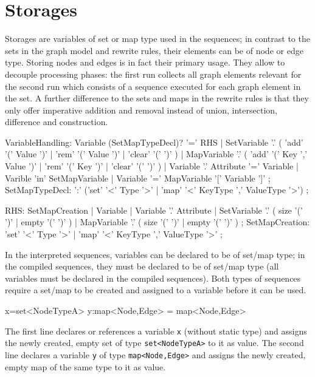 \section{Storages}

Storages are variables of set or map type used in the sequences;
in contrast to the sets in the graph model and rewrite rules, their elements can be of node or edge type. 
Storing nodes and edges is in fact their primary usage. 
They allow to decouple processing phases: the first run collects all graph elements relevant for the second run which consists of a sequence executed for each graph element in the set.
A further difference to the sets and maps in the rewrite rules is that they only offer imperative addition and removal instead of union, intersection, difference and construction.
 
\begin{rail}
  VariableHandling: 
    Variable (SetMapTypeDecl)? '=' RHS |
    SetVariable '.' ( 'add' '(' Value ')' | 'rem' '(' Value ')' | 'clear' '(' ')' ) |
    MapVariable '.' ( 'add' '(' Key ',' Value ')' | 'rem' '(' Key ')' | 'clear' '(' ')' ) |
	Variable '.' Attribute '=' Variable |
	Varible 'in' SetMapVariable |
	Variable '=' MapVariable '[' Variable ']'
    ;
  SetMapTypeDecl: 
    ':' ('set' '<' Type '>' | 'map' '<' KeyType ',' ValueType '>')
    ;
\end{rail}\makeatother

\begin{rail}
  RHS:
    SetMapCreation |
	Variable |
	Variable '.' Attribute |
    SetVariable '.' ( size '(' ')' | empty '(' ')' ) |
    MapVariable '.' ( size '(' ')' | empty '(' ')' )
    ;
  SetMapCreation:
	'set' '<' Type '>' |
    'map' '<' KeyType ',' ValueType '>' 
	;
\end{rail}\makeatother

In the interpreted sequences, variables can be declared to be of set/map type;
in the compiled sequences, they must be declared to be of set/map type (all variables must be declared in the compiled sequences).
Both types of sequences require a set/map to be created and assigned to a variable before it can be used.

\begin{example}
\begin{grgen}
x=set<NodeTypeA>
y:map<Node,Edge> = map<Node,Edge>
\end{grgen}
The first line declares or references a variable \texttt{x} (without static type) and assigns the newly created, empty set of type \texttt{set<NodeTypeA>} to it as value.
The second line declares a variable \texttt{y} of type \texttt{map<Node,Edge>} and assigns the newly created, empty map of the same type to it as value.
\end{example}

